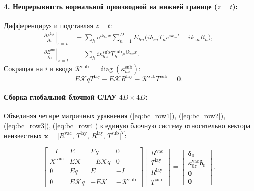 \documentclass[a4paper,11pt]{article}
\begin{document}
\paragraph{4. Непрерывность нормальной производной на нижней границе ($z = t$):}
Дифференцируя и подставляя $z = t$:
\begin{align}
    \left.\frac{\partial E^{\text{lay}}}{\partial z}\right|_{z=t} &= \sum_h e^{i k_{hx} x} \sum_{n=1}^D E_{hn} \big( i k_{zn} T_n e^{i k_{zn} t} - i k_{zn} R_n \big), \\
    \left.\frac{\partial E^{\text{sub}}}{\partial z}\right|_{z=t} &= \sum_h i \kappa_{hz}^{\text{sub}} T_h^{\text{sub}} e^{i k_{hx} x}.
\end{align}
Сокращая на $i$ и вводя $\mathcal{K}^{\text{sub}} = \operatorname{diag}(\kappa_{hz}^{\text{sub}})$:
\begin{equation}
    E \mathcal{K} q T^{\text{lay}} - E \mathcal{K} R^{\text{lay}} - \mathcal{K}^{\text{sub}} T^{\text{sub}} = \mathbf{0}.
    \label{eq:bc_row4}
\end{equation}

\paragraph{Сборка глобальной блочной СЛАУ $4D \times 4D$:}
Объединяя четыре матричных уравнения (\ref{eq:bc_row1}), (\ref{eq:bc_row2}), (\ref{eq:bc_row3}), (\ref{eq:bc_row4}) в единую блочную систему относительно вектора неизвестных $\mathbf{x} = \big[ R^{\text{vac}}, \, T^{\text{lay}}, \, R^{\text{lay}}, \, T^{\text{sub}} \big]^T$:
\begin{mathbox}
\begin{equation}
\begin{bmatrix}
    -I & E & E q & 0 \\
    \mathcal{K}^{\text{vac}} & E \mathcal{K} & -E \mathcal{K} q & 0 \\
    0 & E q & E & -I \\
    0 & E \mathcal{K} q & -E \mathcal{K} & -\mathcal{K}^{\text{sub}}
\end{bmatrix}
\begin{bmatrix}
    R^{\text{vac}} \\
    T^{\text{lay}} \\
    R^{\text{lay}} \\
    T^{\text{sub}}
\end{bmatrix}
=
\begin{bmatrix}
    \boldsymbol{\delta}_0 \\
    \kappa_{0z}^{\text{vac}} \boldsymbol{\delta}_0 \\
    \mathbf{0} \\
    \mathbf{0}
\end{bmatrix}.
\label{eq:global_boundary_matrix}
\end{equation}
\end{mathbox}
\end{document}
